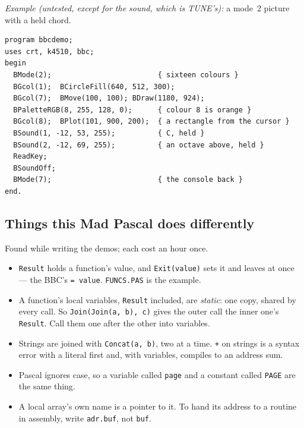 \noindent\emph{Example (untested, except for the sound, which is TUNE's):}
a mode~2 picture with a held chord.

\begin{verbatim}
program bbcdemo;
uses crt, k4510, bbc;
begin
  BMode(2);                         { sixteen colours }
  BGcol(1);  BCircleFill(640, 512, 300);
  BGcol(7);  BMove(100, 100); BDraw(1180, 924);
  BPaletteRGB(8, 255, 128, 0);      { colour 8 is orange }
  BGcol(8);  BPlot(101, 900, 200);  { a rectangle from the cursor }
  BSound(1, -12, 53, 255);          { C, held }
  BSound(2, -12, 69, 255);          { an octave above, held }
  ReadKey;
  BSoundOff;
  BMode(7);                         { the console back }
end.
\end{verbatim}

\subsection*{Things this Mad Pascal does differently}
Found while writing the demos; each cost an hour once.

\begin{itemize}
\item \verb|Result| holds a function's value, and \verb|Exit(value)| sets it
  and leaves at once --- the BBC's \verb|= value|. \texttt{FUNCS.PAS} is the
  example.
\item A function's local variables, \verb|Result| included, are \emph{static}:
  one copy, shared by every call. So \verb|Join(Join(a, b), c)| gives the outer
  call the inner one's \verb|Result|. Call them one after the other into
  variables.
\item Strings are joined with \verb|Concat(a, b)|, two at a time. \verb|+| on
  strings is a syntax error with a literal first and, with variables, compiles
  to an address sum.
\item Pascal ignores case, so a variable called \verb|page| and a constant
  called \verb|PAGE| are the same thing.
\item A local array's own name is a pointer to it. To hand its address to a
  routine in assembly, write \verb|adr.buf|, not \verb|buf|.
\end{itemize}
